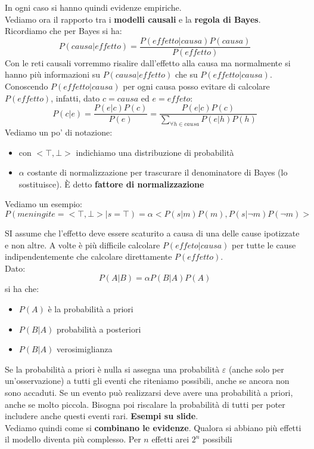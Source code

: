 \documentclass[a4paper,12pt, oneside]{book}
\begin{document}
In ogni caso si hanno quindi evidenze empiriche.\\
Vediamo ora il rapporto tra i \textbf{modelli causali} e la \textbf{regola di
  Bayes}.\\
Ricordiamo che per Bayes si ha:
\[P(causa|effetto)=\frac{P(effetto|causa)P(causa)}{P(effetto)}\]
Con le reti causali vorremmo risalire dall'effetto alla causa ma normalmente si
hanno più informazioni su $P(causa|effetto)$ che su $P(effetto|causa)$.\\
Conoscendo $P(effetto|causa)$ per ogni causa posso evitare di calcolare
$P(effetto)$, infatti, dato $c=causa$ ed $e=effeto$:
\[P(c|e)=\frac{P(e|c)P(c)}{P(e)}=\frac{P(e|c)P(c)}{\sum_{\forall h\in
      causa}P(e|h)P(h)}\] 
Vediamo un po' di notazione:
\begin{itemize}
  \item con $<\top,\bot>$ indichiamo una distribuzione di probabilità
  \item $\alpha$ costante di normalizzazione per trascurare il denominatore di
  Bayes (lo sostituisce). È detto \textbf{fattore di normalizzazione}
\end{itemize}
\begin{esempio}
  Vediamo un esempio:
  \[P(meningite=<\top,\bot>|s=\top)=\alpha<P(s|m)P(m),P(s|\neg m)P(\neg m)>\]
\end{esempio}
SI assume che l'effetto deve essere scaturito a causa di una delle cause
ipotizzate e non altre. A volte è più difficile calcolare $P(effeto|causa)$ per
tutte le cause indipendentemente che calcolare direttamente $P(effetto)$.\\
Dato:
\[P(A|B)=\alpha P(B|A)P(A)\]
si ha che:
\begin{itemize}
  \item $P(A)$ è la probabilità a priori
  \item $P(B|A)$ probabilità a posteriori
  \item $P(B|A)$ verosimiglianza
\end{itemize}
Se la probabilità a priori è nulla si assegna una probabilità $\varepsilon$
(anche solo per un'osservazione) a tutti gli eventi che riteniamo possibili,
anche se ancora non sono accaduti. Se un evento può realizzarsi deve avere una
probabilità a priori, anche se molto piccola. Bisogna poi riscalare la
probabilità di tutti per poter includere anche questi eventi
rari. \textbf{Esempi su slide}.\\
Vediamo quindi come si \textbf{combinano le evidenze}. Qualora si abbiano più
effetti il modello diventa più complesso. Per $n$ effetti arei $2^n$ possibili
\end{document}
